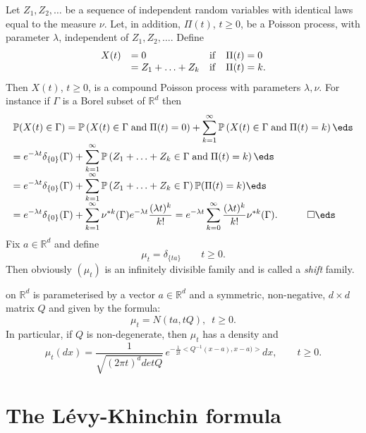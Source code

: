 \documentclass[preprint]{imsart}
\def\P{\mathbb P}
\def\R{\mathbb R}
\def\ds{\displaystyle}
\begin{document}
{\noindent Let $Z_1,Z_2,\ldots$ be a sequence of independent
random variables with identical laws equal to the
measure $\nu$. Let, in addition, $\Pi(t)$, $t\geq 0$,
be a Poisson process, with parameter $\lambda$,
independent of $Z_1,Z_2,\ldots$. Define
$$
  \begin{array}{llll}
    X(t) & =  0& {\rm if} & \Pi(t)=0 \\
      & = Z_1+\ldots +Z_k  & {\rm if }& \Pi(t)=k.
  \end{array}
$$
Then $X(t)$, $t\geq 0$, is a compound Poisson process
with parameters $\lambda,\nu$. For instance if $\Gamma$
is a Borel subset of $\R^d$ then
$$
  \begin{array}{l}
    \ds
\P(X(t)\in\Gamma )=
\P\left(X(t)\in\Gamma {\rm \; and \;} \Pi(t)=0\right)
+\sum
_{k=1}^{\infty}
\P\left(X(t)\in\Gamma {\rm \; and \;} \Pi(t)=k\right)
    \eds \\
    \ds
= e^{-\lambda t}\delta_{\{0\}}(\Gamma)
+\sum
_{k=1}^{\infty}
\P\left(Z_1+\ldots +Z_k\in\Gamma {\rm \; and \;} \Pi(t)=k\right)
    \eds \\
    \ds
    = e^{-\lambda t}\delta_{\{0\}}(\Gamma)
+\sum
_{k=1}^{\infty}
\P\left(Z_1+\ldots +Z_k\in\Gamma \right)
\P( \Pi(t)=k)
    \eds \\
    \ds
    = e^{-\lambda t}\delta_{\{0\}}(\Gamma)
+\sum
_{k=1}^{\infty}
\nu^{*k}(\Gamma )e^{-\lambda t}
\frac{(\lambda t)^k}{k!}=e^{-\lambda t}
\sum
_{k=0}^{\infty}
\frac{(\lambda t)^k}{k!}\nu^{*k}(\Gamma ). \quad \qed
    \eds
  \end{array}
$$
\vspace{2mm} Fix $a\in\R^d$ and define
$$
\mu_t=\delta_{\{ta\}}\qquad t\geq 0.
$$
Then obviously $(\mu_t)$ is an infinitely divisible family and is called a {\it shift} family.
\vspace{2mm}

 on $\R^d$ is parameterised by a vector $a\in \R^d$ and
a symmetric, non-negative, $d\times d$ matrix $Q$ and given by the formula:
$$
\mu_t = N (ta, tQ),\,\,\,t\geq 0.
$$
In particular, if $Q$ is non-degenerate, then $\mu_t$ has a density and
$$
\mu_t(dx)=\frac{1}{\sqrt{(2\pi t )^d detQ}}\,
e^{-\frac{1}{2t}<Q^{-1}(x-a),x-a)>}dx,\qquad t\geq 0.
$$
\vspace{2mm}







\section{The L\'evy-Khinchin formula}


}
\end{document}
